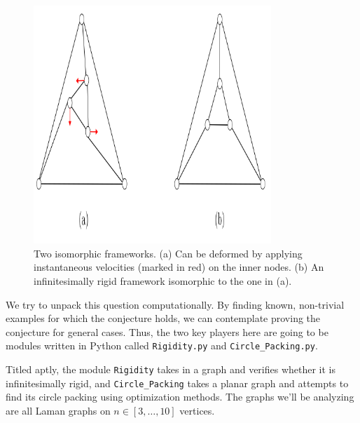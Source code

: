 \begin{figure}[htbp]
    \centering
    \includegraphics[width = 0.8\textwidth]{Chapter 4/2. Isomorphic but not inf rigid.png}
    \caption{Two isomorphic frameworks. (a) Can be deformed by applying instantaneous velocities (marked in red) on the inner nodes. (b) An infinitesimally rigid framework isomorphic to the one in (a).}
    \label{fig4: iso but not rig}
\end{figure}
\vspace{-3mm}
\begin{flushleft}
We try to unpack this question computationally. By finding known, non-trivial examples for which the conjecture holds, we can contemplate proving the conjecture for general cases. Thus, the two key players here are going to be modules written in Python called \texttt{Rigidity.py} and \texttt{Circle\_Packing.py}. 
\end{flushleft}

\begin{flushleft}
Titled aptly, the module \texttt{Rigidity} takes in a graph and verifies whether it is infinitesimally rigid, and \texttt{Circle\_Packing} takes a planar graph and attempts to find its circle packing using optimization methods. The graphs we'll be analyzing are all Laman graphs on $n \in [3, \hdots, 10]$ vertices.  
\end{flushleft}

